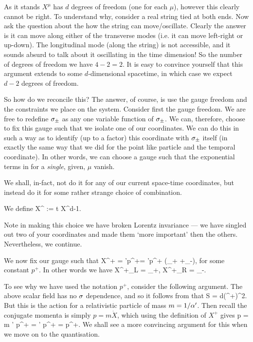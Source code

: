 As it stands $X^{\mu}$ has $d$ degrees of freedom (one for each $\mu$), however this clearly cannot be right. To understand why, consider a real string tied at both ends. Now ask the question about the how the string can move/oscillate. Clearly the answer is it can move along either of the transverse modes (i.e. it can move left-right or up-down). The longitudinal mode (along the string) is not accessible, and it sounds absurd to talk about it oscillating in the time dimension! So the number of degrees of freedom we have $4-2=2$. It is easy to convince yourself that this argument extends to some $d$-dimensional spacetime, in which case we expect $d-2$ degrees of freedom. 

So how do we reconcile this? The answer, of course, is use the gauge freedom and the constraints we place on the system. Consider first the gauge freedom. We are free to redefine $\sigma_{\pm}$ as any one variable function of $\sigma_{\pm}$. We can, therefore, choose to fix this gauge such that we isolate one of our coordinates. We can do this in such a way as to identify (up to a factor) this coordinate with $\sigma_{\pm}$ itself (in exactly the same way that we did for the point like particle and the temporal coordinate). In other words, we can choose a gauge such that the exponential terms in  for a \textit{single}, given, $\mu$ vanish. 

We shall, in-fact, not do it for any of our current space-time coordinates, but instead do it for some rather strange choice of combination. 

\bd 
    We define 
    \be 
    \label{eqn:xpm}
        X^{\pm} := t \pm X^{d-1}.
    \ee 
\ed 

\br 
    Note in making this choice we have broken Lorentz invariance --- we have singled out two of your coordinates and made them `more important' then the others. Nevertheless, we continue.
\er 

We now fix our gauge such that 
\be 
\label{eqn:xplus}
    X^+ = \a'p^+\tau = \a'p^+ (\sig_+ +\sig_-),
\ee 
for some constant $p^+$. In other words we have 
\be 
\label{eqn:xplusLR}
    X^+_L =  \sig_+, \qquad {} \qquad X^+_R = \sig_-.
\ee 

\br 
    To see why we have used the notation $p^+$, consider the following argument. The above scalar field has no $\sigma$ dependence, and so it follows from  that 
    \bse 
        S =  \int d\tau (^+)^2.
    \ese
    But this is the action for a relativistic particle of mass $m=1/\alpha'$. Then recall the conjugate momenta is simply $p=m\dot{X}$, which using the definition of $X^+$ gives
    \bse 
        p = m \a' p^+ =  \a' p^+ = p^+.
    \ese 
    We shall see a more convincing argument for this when we move on to the quantisation. 
\er 


